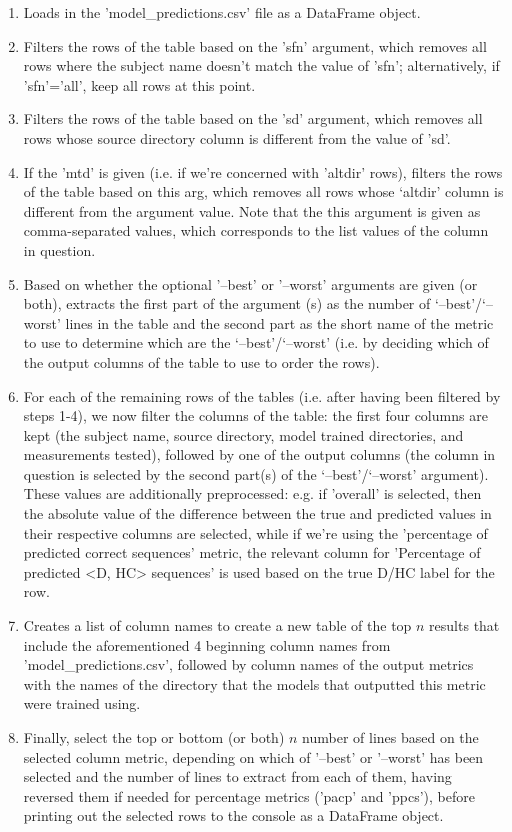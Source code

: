 \documentclass[12pt,twoside]{report}
\begin{document}
\begin{enumerate}
	\item Loads in the 'model\_predictions.csv' file as a DataFrame object.
	\item Filters the rows of the table based on the 'sfn' argument, which removes all rows where the subject name doesn't match the value of 'sfn'; alternatively, if 'sfn'=’all’, keep all rows at this point.
	\item Filters the rows of the table based on the 'sd' argument, which removes all rows whose source directory column is different from the value of 'sd'.
	\item If the 'mtd' is given (i.e. if we're concerned with 'altdir' rows), filters the rows of the table based on this arg, which removes all rows whose ‘altdir’ column is different from the argument value. Note that the this argument is given as comma-separated values, which corresponds to the list values of the column in question.
	\item Based on whether the optional '--best' or '--worst' arguments are given (or both), extracts the first part of the argument (s) as the number of ‘--best’/‘--worst' lines in the table and the second part as the short name of the metric to use to determine which are the ‘--best'/‘--worst' (i.e. by deciding which of the output columns of the table to use to order the rows).
	\item For each of the remaining rows of the tables (i.e. after having been filtered by steps 1-4), we now filter the columns of the table: the first four columns are kept (the subject name, source directory, model trained directories, and measurements tested), followed by one of the output columns (the column in question is selected by the second part(s) of the ‘--best'/‘--worst' argument). These values are additionally preprocessed: e.g. if 'overall' is selected, then the absolute value of the difference between the true and predicted values in their respective columns are selected, while if we're using the 'percentage of predicted correct sequences' metric, the relevant column for 'Percentage of predicted <D, HC> sequences' is used based on the true D/HC label for the row.
	\item Creates a list of column names to create a new table of the top $n$ results that include the aforementioned 4 beginning column names from 'model\_predictions.csv', followed by column names of the output metrics with the names of the directory that the models that outputted this metric were trained using.
	\item Finally, select the top or bottom (or both) $n$ number of lines based on the selected column metric, depending on which of '--best' or '--worst' has been selected and the number of lines to extract from each of them, having reversed them if needed for percentage metrics ('pacp' and 'ppcs'), before printing out the selected rows to the console as a DataFrame object.
\end{enumerate}
\end{document}
